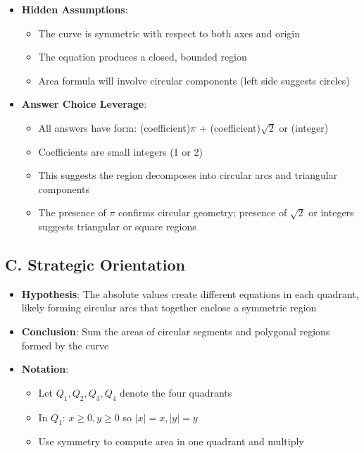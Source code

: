 \documentclass[]{article}
\begin{document}
\begin{problemconfigbox}
\begin{itemize}[leftmargin=*]
    \item \textbf{Hidden Assumptions}: 
    \begin{itemize}
        \item The curve is symmetric with respect to both axes and origin
        \item The equation produces a closed, bounded region
        \item Area formula will involve circular components (left side suggests circles)
    \end{itemize}
    
    \item \textbf{Answer Choice Leverage}: 
    \begin{itemize}
        \item All answers have form: (coefficient)$\pi$ + (coefficient)$\sqrt{2}$ or (integer)
        \item Coefficients are small integers (1 or 2)
        \item This suggests the region decomposes into circular arcs and triangular components
        \item The presence of $\pi$ confirms circular geometry; presence of $\sqrt{2}$ or integers suggests triangular or square regions
    \end{itemize}
\end{itemize}

\subsection*{C. Strategic Orientation}
\begin{itemize}[leftmargin=*]
    \item \textbf{Hypothesis}: The absolute values create different equations in each quadrant, likely forming circular arcs that together enclose a symmetric region
    
    \item \textbf{Conclusion}: Sum the areas of circular segments and polygonal regions formed by the curve
    
    \item \textbf{Notation}: 
    \begin{itemize}
        \item Let $Q_1, Q_2, Q_3, Q_4$ denote the four quadrants
        \item In $Q_1$: $x \geq 0, y \geq 0$ so $|x|=x, |y|=y$
        \item Use symmetry to compute area in one quadrant and multiply
    \end{itemize}
    

\end{itemize}
\end{problemconfigbox}
\end{document}
